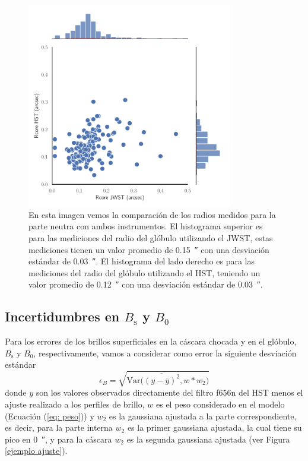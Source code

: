 \documentclass{book}
\begin{document}
\begin{figure}[htb]
    \centering
    \includegraphics[width=0.8\textwidth]{ultimos/Rcore(1).pdf}
    \caption{En esta imagen vemos la comparación de los radios medidos para la parte neutra con ambos instrumentos. El histograma superior es para las mediciones del radio del glóbulo utilizando el JWST, estas mediciones tienen un valor promedio de \SI{0.15}{\arcsecond} con una desviación estándar de \SI{0.03}{\arcsecond}. El histograma del lado derecho es para las mediciones del radio del glóbulo utilizando el HST, teniendo un valor promedio de \SI{0.12}{\arcsecond} con una desviación estándar de \SI{0.03}{\arcsecond}. }
    \label{fig:Rcore dis}
\end{figure}

\subsection{\boldmath Incertidumbres en $B_\mathrm{s}$ y $B_0$}

Para los errores de los brillos superficiales en la cáscara chocada y en el glóbulo, $B_\mathrm{s}$ y $B_0$, respectivamente, vamos a considerar como error la siguiente desviación estándar
\begin{equation} \epsilon_{B}=\sqrt{\mathrm{Var}\Big(\overline{(y-\overline{y})^2},w*w_2\Big)} 
\end{equation} 
donde $y$ son los valores observados directamente del filtro f656n del HST menos el ajuste realizado a los perfiles de brillo, $w$ es el peso considerado en el modelo (Ecuación (\ref{eq: peso})) y $w_2$ es la gaussiana ajustada a la parte correspondiente, es decir, para la parte interna $w_2$ es la primer gaussiana ajustada, la cual tiene su pico en \SI{0}{\arcsecond}, y para la cáscara $w_2$ es la segunda gaussiana ajustada (ver Figura \ref{ejemplo ajuste}).\\
\end{document}
